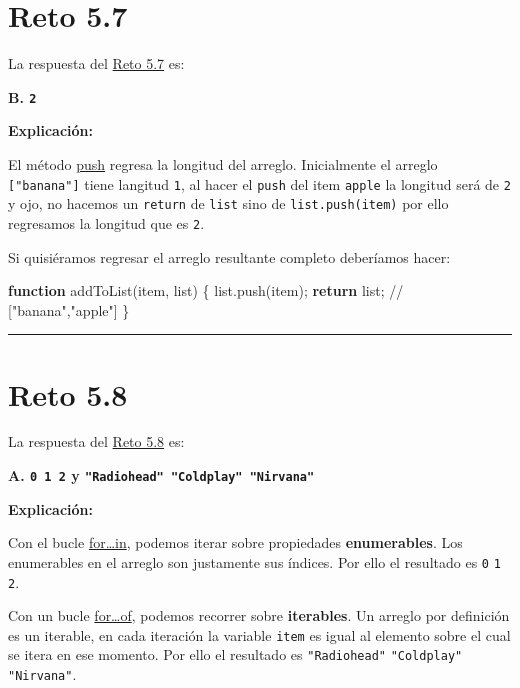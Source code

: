 \documentclass[
  letterpaper,
  DIV=11,
  numbers=noendperiod]{scrreprt}
\newenvironment{Shaded}{\begin{snugshade}}{\end{snugshade}}
\newcommand{\CommentTok}[1]{\textcolor[rgb]{0.37,0.37,0.37}{#1}}
\newcommand{\ControlFlowTok}[1]{\textcolor[rgb]{0.00,0.23,0.31}{\textbf{#1}}}
\newcommand{\FunctionTok}[1]{\textcolor[rgb]{0.28,0.35,0.67}{#1}}
\newcommand{\KeywordTok}[1]{\textcolor[rgb]{0.00,0.23,0.31}{\textbf{#1}}}
\newcommand{\NormalTok}[1]{\textcolor[rgb]{0.00,0.23,0.31}{#1}}
\newcommand{\OperatorTok}[1]{\textcolor[rgb]{0.37,0.37,0.37}{#1}}
\begin{document}
\section{Reto 5.7}\label{sec-sol-cap5-reto7}

La respuesta del \hyperref[sec-cap5-reto7]{Reto 5.7} es:

\textbf{B. \texttt{2}}

\textbf{Explicación:}

El método \hyperref[glos-push]{push} regresa la longitud del arreglo.
Inicialmente el arreglo \texttt{{[}"banana"{]}} tiene langitud
\texttt{1}, al hacer el \texttt{push} del item \texttt{apple} la
longitud será de \texttt{2} y ojo, no hacemos un \texttt{return} de
\texttt{list} sino de \texttt{list.push(item)} por ello regresamos la
longitud que es \texttt{2}.

Si quisiéramos regresar el arreglo resultante completo deberíamos hacer:

\begin{Shaded}
\begin{Highlighting}[]
\KeywordTok{function} \FunctionTok{addToList}\NormalTok{(item}\OperatorTok{,}\NormalTok{ list) \{}
\NormalTok{  list}\OperatorTok{.}\FunctionTok{push}\NormalTok{(item)}\OperatorTok{;}
  \ControlFlowTok{return}\NormalTok{ list}\OperatorTok{;} \CommentTok{// ["banana","apple"]}
\NormalTok{\}}
\end{Highlighting}
\end{Shaded}

\begin{center}\rule{0.5\linewidth}{0.5pt}\end{center}

\section{Reto 5.8}\label{sec-sol-cap5-reto8}

La respuesta del \hyperref[sec-cap5-reto8]{Reto 5.8} es:

\textbf{A. \texttt{0\ 1\ 2} y
\texttt{"Radiohead"\ "Coldplay"\ "Nirvana"}}

\textbf{Explicación:}

Con el bucle \hyperref[glos-for-in]{for\ldots in}, podemos iterar sobre
propiedades \textbf{enumerables}. Los enumerables en el arreglo son
justamente sus índices. Por ello el resultado es \texttt{0} \texttt{1}
\texttt{2}.

Con un bucle \hyperref[glos-for_of]{for\ldots of}, podemos recorrer
sobre \textbf{iterables}. Un arreglo por definición es un iterable, en
cada iteración la variable \texttt{item} es igual al elemento sobre el
cual se itera en ese momento. Por ello el resultado es
\texttt{"Radiohead"} \texttt{"Coldplay"} \texttt{"Nirvana"}.
\end{document}
